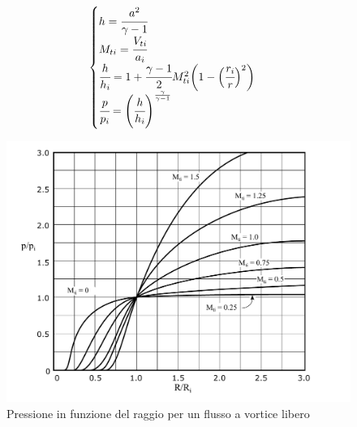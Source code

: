 \begin{align*}
\begin{cases}
h = \cfrac{a ^ 2}{\gamma - 1} \\
M_{ti} = \cfrac{V_{ti}}{a_i}\\
\cfrac{h}{h_i} = 1 + \cfrac{\gamma -1}{2} M_{ti}^2 \bigg(1 -  \Big( \cfrac{r_i}{r}\Big)^2 \bigg)\\
\cfrac{p}{p_i} = \left( \cfrac{h}{h_i} \right)^{\frac{\gamma}{\gamma - 1}}
\end{cases}
\end{align*}
\begin{figure}
\centering
  \includegraphics[width=.8\textwidth]{fig/VorticeLibero.pdf}
\caption{Pressione in funzione del raggio per un flusso a vortice libero}
\label{fig:VorticeLibero}
\end{figure}

